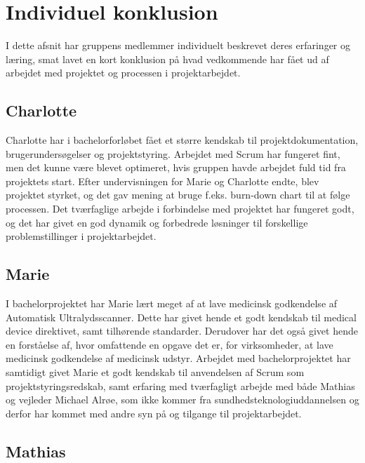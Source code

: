 \chapter{Individuel konklusion}\label{IndividuelKonklusion}
I dette afsnit har gruppens medlemmer individuelt beskrevet deres erfaringer og læring, smat lavet en kort konklusion på hvad vedkommende har fået ud af arbejdet med projektet og processen i projektarbejdet. 

\section{Charlotte}
Charlotte har i bachelorforløbet fået et større kendskab til projektdokumentation, brugerundersøgelser og projektstyring. Arbejdet med Scrum har fungeret fint, men det kunne være blevet optimeret, hvis gruppen havde arbejdet fuld tid fra projektets start. Efter undervisningen for Marie og Charlotte endte, blev projektet styrket, og det gav mening at bruge f.eks. burn-down chart til at følge processen. Det tværfaglige arbejde i forbindelse med projektet har fungeret godt, og det har givet en god dynamik og forbedrede løsninger til forskellige problemstillinger i projektarbejdet. 

\section{Marie}
I bachelorprojektet har Marie lært meget af at lave medicinsk godkendelse af Automatisk Ultralydsscanner. Dette har givet hende et godt kendskab til medical device direktivet, samt tilhørende standarder. Derudover har det også givet hende en forståelse af, hvor
omfattende en opgave det er, for virksomheder, at lave medicinsk godkendelse af medicinsk udstyr. Arbejdet med bachelorprojektet har samtidigt givet Marie et godt kendskab til anvendelsen af Scrum som projektstyringsredskab, samt erfaring med tværfagligt arbejde med både Mathias og vejleder Michael Alrøe, som ikke kommer fra sundhedsteknologiuddannelsen og derfor har kommet med andre syn på og tilgange til projektarbejdet.

\section{Mathias}
